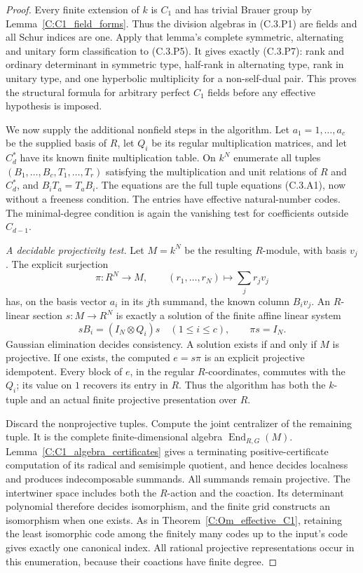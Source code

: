 \begin{proof}
Every finite extension of $k$ is $C_1$ and has trivial Brauer
group by Lemma~\ref{C:C1_field_forms}. Thus the division
algebras in (C.3.P1) are fields and all Schur indices are one.
Apply that lemma's complete symmetric, alternating and
unitary form classification to (C.3.P5). It gives exactly
(C.3.P7): rank and ordinary determinant in symmetric type,
half-rank in alternating type, rank in unitary type, and
one hyperbolic multiplicity for a non-self-dual pair.
This proves the structural formula for arbitrary perfect
$C_1$ fields before any effective hypothesis is imposed.

We now supply the additional nonfield steps in the algorithm.
Let $a_1=1,\ldots,a_c$ be the supplied basis of $R$, let
$Q_i$ be its regular multiplication matrices, and let
$C_d^*$ have its known finite multiplication table.
On $k^N$ enumerate all tuples $(B_1,\ldots,B_c,T_1,\ldots,T_r)$
satisfying the multiplication and unit relations of $R$
and $C_d^*$, and $B_iT_a=T_aB_i$.
The equations are the full tuple equations (C.3.A1), now
without a freeness condition. The entries have effective
natural-number codes. The minimal-degree condition is again
the vanishing test for coefficients outside $C_{d-1}$.

\emph{A decidable projectivity test.}
Let $M=k^N$ be the resulting $R$-module, with basis $v_j$.
The explicit surjection
\[
 \pi:R^N\longrightarrow M,\qquad
              (r_1,\ldots,r_N)\longmapsto\sum_j r_jv_j
                                                               \tag{C.3.P8}
\]
has, on the basis vector $a_i$ in its $j$th summand,
the known column $B_iv_j$.
An $R$-linear section $s:M\to R^N$ is exactly a solution
of the finite affine linear system
\[
       sB_i=(I_N\otimes Q_i)s\quad(1\leq i\leq c),
                  \qquad \pi s=I_N.                         \tag{C.3.P9}
\]
Gaussian elimination decides consistency. A solution exists
if and only if $M$ is projective. If one exists, the computed
$e=s\pi$ is an explicit projective idempotent.
Every block of $e$, in the regular $R$-coordinates, commutes
with the $Q_i$; its value on $1$ recovers its entry in $R$.
Thus the algorithm has both the $k$-tuple and an actual
finite projective presentation over $R$.

Discard the nonprojective tuples. Compute the joint
centralizer of the remaining tuple. It is the complete
finite-dimensional algebra $\operatorname{End}_{R,G}(M)$.
Lemma~\ref{C:C1_algebra_certificates} gives a terminating
positive-certificate computation of its radical and
semisimple quotient, and hence decides localness and
produces indecomposable summands. All summands remain
projective. The intertwiner space includes both the
$R$-action and the coaction. Its determinant polynomial
therefore decides isomorphism, and the finite grid
constructs an isomorphism when one exists.
As in Theorem~\ref{C:Om_effective_C1}, retaining the least
isomorphic code among the finitely many codes up to the
input's code gives exactly one canonical index.
All rational projective representations occur in this
enumeration, because their coactions have finite degree.


\end{proof}
